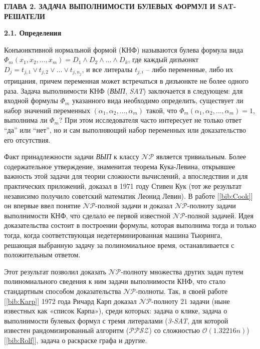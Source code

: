 \newpage
\begin{center}
\noindent\textbf{ГЛАВА 2. ЗАДАЧА ВЫПОЛНИМОСТИ БУЛЕВЫХ ФОРМУЛ И SAT-РЕШАТЕЛИ}\label{chapters:2}
\vspace{1.5mm}
\end{center}

\vspace{5pt}
\textbf{2.1. Определения}\label{chapters:2.1}
\vspace{5pt}

Конъюнктивной нормальной формой (КНФ) называются булева формула вида 
$\Phi_m \left( x_1, x_2, \dots, x_m \right) = D_1 \land D_2 \land \dots \land D_k$,
где каждый дизъюнкт $D_j=t_{j,1} \lor t_{j,2} \lor \dots \lor t_{j,n_j}$, 
и все литералы $t_{j,i}$ – либо переменные, либо их отрицания,
причем переменная может встречаться в дизъюнкте не более одного раза. 
Задача выполнимости КНФ (\textit{ВЫП}, \textit{SAT}) заключается в следующем: для входной формулы $\Phi_m$ указанного вида 
необходимо определить, существует ли набор значений переменных $\left( \alpha_1, \alpha_2, \dots, \alpha_m \right)$ такой,
что $\Phi_m \left( \alpha_1, \alpha_2, \dots, \alpha_m \right) = 1$, выполнима ли $\Phi_m$? 
При этом исследователя часто интересует не только ответ \enquote{да} или \enquote{нет}, но и сам выполняющий набор переменных или доказательство его отсутствия.

Факт принадлежности задачи \textit{ВЫП} к классу $\mathcal{NP}$ является тривиальным. Более содержательное утверждение, 
знаменитая теорема Кука-Левина, открывшее важность этой задачи для теории сложности вычислений, 
а впоследствии и для практических приложений, доказал в 1971 году Стивен Кук (тот же результат независимо получило советский математик Леонид Левин). В работе [\ref{bib:Cook}] он впервые ввел понятие $\mathcal{NP}$-полной задачи и доказал $\mathcal{NP}$-полноту 
задачи выполнимости КНФ, что сделало ее первой известной $\mathcal{NP}$-полной задачей. 
Идея доказательства состоит в построении формулы, которая выполнима тогда и только тогда, когда соответствующая 
недетерминированная машина Тьюринга, решающая выбранную задачу за полиномиальное время, останавливается с положительным ответом.

Этот результат позволил доказать $\mathcal{NP}$-полноту множества других задач путем полиномиального сведения к ним задачи выполнимости КНФ, что стало стандартным способом доказательства $\mathcal{NP}$-полноты. 
Так, в своей работе [\ref{bib:Karp}] 1972 года Ричард Карп доказал $\mathcal{NP}$-полноту $21$ задачи (ныне известных как «список Карпа»), 
среди которых: задача о клике, задача о выполнимости булевых формул с тремя литералами (\textit{3-SAT}, 
для которой известен рандомизированный алгоритм ($\mathcal{PPSZ}$) со сложностью $\mathcal{O} \left( 1.32216n \right)$) [\ref{bib:Rolf}], 
задача о раскраске графа и другие.

